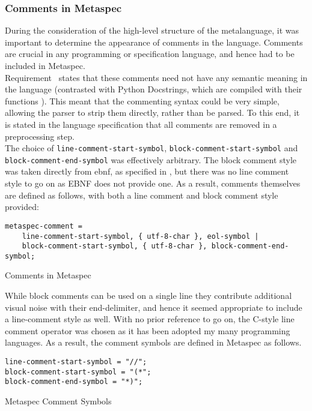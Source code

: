
\subsubsection{Comments in Metaspec} %
\label{ssub:comments_in_metaspec}
During the consideration of the high-level structure of the metalanguage, it was important to determine the appearance of comments in the language.
Comments are crucial in any programming or specification language, and hence had to be included in Metaspec. \\

Requirement~ states that these comments need not have any semantic meaning in the language (contrasted with Python Docstrings, which are compiled with their functions \citep{python_docstrings}).
This meant that the commenting syntax could be very simple, allowing the parser to strip them directly, rather than be parsed.
To this end, it is stated in the language specification that all comments are removed in a preprocessing step. \\

The choice of \texttt{line-comment-start-symbol}, \texttt{block-comment-start-symbol} and \texttt{block-comment-end-symbol} was effectively arbitrary.
The block comment style was taken directly from \gls{ebnf}, as specified in \cite{standard1996ebnf}, but there was no line comment style to go on as EBNF does not provide one. 
As a result, comments themselves are defined as follows, with both a line comment and block comment style provided:
\begin{listing}[!htb]
\begin{verbatim}
metaspec-comment =
    line-comment-start-symbol, { utf-8-char }, eol-symbol |
    block-comment-start-symbol, { utf-8-char }, block-comment-end-symbol;
\end{verbatim}
\caption{Comments in Metaspec}
\label{lst:comments_in_metaspec}
\end{listing}

While block comments can be used on a single line they contribute additional visual noise with their end-delimiter, and hence it seemed appropriate to include a line-comment style as well.
With no prior reference to go on, the C-style line comment operator was chosen as it has been adopted my many programming languages.
As a result, the comment symbols are defined in Metaspec as follows.
\begin{listing}[!htb]
\begin{verbatim}
line-comment-start-symbol = "//";
block-comment-start-symbol = "(*";
block-comment-end-symbol = "*)";
\end{verbatim}
\caption{Metaspec Comment Symbols}
\label{lst:metaspec_comment_symbols}
\end{listing}

